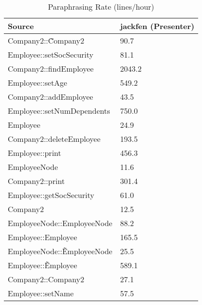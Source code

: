 \begin{table}[hb]
\begin{center}
\begin{tabular}{|l|l|}
\hline
Source & jackfen (Presenter)\\
\hline
Company2::\~Company2 & 90.7\\
Employee::setSocSecurity & 81.1\\
Company2::findEmployee & 2043.2\\
Employee::setAge & 549.2\\
Company2::addEmployee & 43.5\\
Employee::setNumDependents & 750.0\\
Employee & 24.9\\
Company2::deleteEmployee & 193.5\\
Employee::print & 456.3\\
EmployeeNode & 11.6\\
Company2::print & 301.4\\
Employee::getSocSecurity & 61.0\\
Company2 & 12.5\\
EmployeeNode::EmployeeNode & 88.2\\
Employee::Employee & 165.5\\
EmployeeNode::\~EmployeeNode & 25.5\\
Employee::\~Employee & 589.1\\
Company2::Company2 & 27.1\\
Employee::setName & 57.5\\
\hline
\end{tabular}
\end{center}
\caption{Paraphrasing Rate (lines/hour)}
\end{table}

